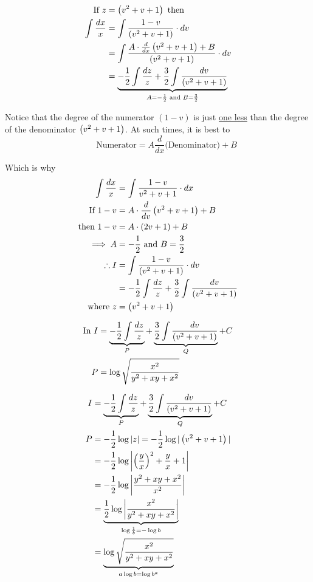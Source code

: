 \documentclass[14pt,fleqn]{extarticle}
\begin{document}
\begin{align}
\text{If } z &= \left(v^2 + v + 1\right) \text{ then } \\
\int \frac{dx}{x} &= \int \frac{1-v}{\left(v^2 + v + 1\right)}\cdot dv \\ 
&= \int \frac{A\cdot \frac{d}{dx} \left(v^2 + v + 1\right) + B }{\left(v^2 + v + 1\right)}\cdot dv  \\
&= \underbrace{-\frac{1}{2}\int \frac{dz}{z} + \frac{3}{2}\int \frac{dv}{\left(v^2 + v + 1\right)}}_{A = -\frac{1}{2}\text{ and } B = \frac{3}{2}}
\end{align}

\newcard 

Notice that the degree of the numerator $(1-v)$ is just \underline{one less} than the degree of the denominator $\left(v^2 + v + 1\right)$. At such times, it is best to 
\small\[ \qquad \text{Numerator} = A \frac{d}{dx}\text{(Denominator)} + B \]\normalsize

Which is why 
\begin{align}
\int \frac{dx}{x} &= \int \frac{1-v}{v^2+v+1}\cdot dx \\ 
\text{If } 1 - v &= A\cdot \frac{d}{dv}\left(v^2 + v + 1\right) + B \\
\text{then } 1- v &= A\cdot (2v+1) + B \\
\implies A &= -\frac{1}{2}\text{ and } B = \frac{3}{2}\\
\therefore I &= \int \frac{1-v}{\left(v^2 + v + 1\right)}\cdot dv \\
&= -\frac{1}{2}\int \frac{dz}{z} + \frac{3}{2}\int \frac{dv}{\left(v^2 + v + 1\right)} \\
\text{where } z &= \left(v^2 + v + 1\right) 
\end{align}

\newcard 

\begin{align}
\text{In }I &= \underbrace{-\frac{1}{2}\int \frac{dz}{z}}_P + \underbrace{\frac{3}{2}\int \frac{dv}{\left(v^2 + v + 1\right)}}_Q + C \\
P &= \log \sqrt{\frac{x^2}{y^2 + xy + x^2}} 
\end{align}

\newcard 

\begin{align}
	I &= \underbrace{-\frac{1}{2}\int \frac{dz}{z}}_P + \underbrace{\frac{3}{2}\int \frac{dv}{\left(v^2 + v + 1\right)}}_Q + C \\
	P &= -\frac{1}{2}\log \vert z\vert = -\frac{1}{2}\log \vert\left(v^2 + v + 1\right)\vert \\
	&= -\frac{1}{2}\log\left\vert \left(\frac{y}{x} \right)^2 + \frac{y}{x} + 1 \right\vert \\
	&= -\frac{1}{2}\log\left\vert \frac{y^2 + xy + x^2}{x^2}\right\vert  \\
	&= \underbrace{\frac{1}{2}\log\left\vert \frac{x^2}{y^2+xy+x^2}\right\vert}_{\log \frac{1}{b} = -\log b } \\
	&= \underbrace{\log \sqrt{\frac{x^2}{y^2+xy+x^2}}}_{ a\log b = \log b^a }
\end{align}
\end{document}
